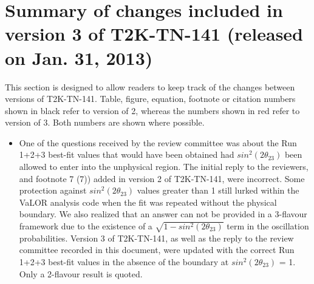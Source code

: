 \clearpage

\section{Summary of changes included in version 3 of T2K-TN-141 (released on Jan. 31, 2013)}

This section is designed to allow readers to keep track of the changes between versions of T2K-TN-141.
Table, figure, equation, footnote or citation numbers shown in black refer to version of 2,
{\color{red}whereas the numbers shown in red refer to version of 3}.
Both numbers are shown where possible.

\begin{itemize}

\item
One of the questions received by the review committee was about the Run 1+2+3 best-fit values 
that would have been obtained had $sin^{2}(2\theta_{23})$ been allowed to enter into the unphysical region. 
The initial reply to the reviewers, and footnote 7 {\color{red}(7)}) added in version 2 of T2K-TN-141, were incorrect.
Some protection against $sin^{2}(2\theta_{23})$ values greater than 1 still lurked within the VaLOR analysis code
when the fit was repeated without the physical boundary. We also realized that an answer can not be provided in a 3-flavour
framework due to the existence of a $\sqrt{1-sin^{2}(2\theta_{23})}$ term in the oscillation probabilities.
Version 3 of T2K-TN-141, as well as the reply to the review committee recorded in this document, were updated 
with the correct Run 1+2+3 best-fit values in the absence of the boundary at  $sin^{2}(2\theta_{23})$ = 1.
Only a 2-flavour result is quoted.

\end{itemize}





